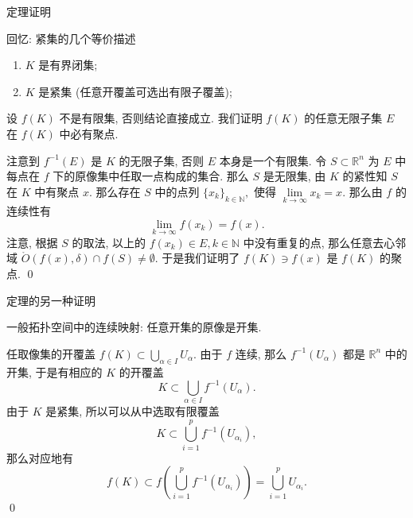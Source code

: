
\begin{frame}{定理证明}

回忆: 紧集的几个等价描述
\begin{enumerate}
\item $K$ 是有界闭集;
\item $K$ 是紧集 (任意开覆盖可选出有限子覆盖);
\end{enumerate}

\pause
\vspace{0.5em}

设 $f(K)$ 不是有限集, 否则结论直接成立. 我们证明 $f(K)$ 的任意无限子集 $E$ 在 $f(K)$ 中必有聚点.

\pause
\vspace{0.5em}

注意到 $f^{-1}(E)$ 是 $K$ 的无限子集, 否则 $E$ 本身是一个有限集. 令 $S \subset \mathbb{R}^n$ 为 $E$ 中每点在 $f$ 下的原像集中任取一点构成的集合. 那么 $S$ 是无限集, 由 $K$ 的紧性知 $S$ 在 $K$ 中有聚点 $x.$ 那么存在 $S$ 中的点列 $\{x_k\}_{k \in \mathbb{N}},$ 使得 $\lim\limits_{k \to \infty} x_k = x.$ 那么由 $f$ 的连续性有
\[\lim\limits_{k \to \infty} f(x_k) = f(x).\]
注意, 根据 $S$ 的取法, 以上的 $f(x_k) \in E, k \in \mathbb{N}$ 中没有重复的点, 那么任意去心邻域 $\mathring{O}(f(x), \delta) \cap f(S) \neq \emptyset.$ 于是我们证明了 $f(K) \ni f(x)$ 是 $f(K)$ 的聚点.
\qed

\end{frame}


\begin{frame}{定理的另一种证明}

一般拓扑空间中的连续映射: 任意开集的原像是开集.

\pause
\vspace{1em}

任取像集的开覆盖 $f(K) \subset \bigcup\limits_{\alpha \in I} U_{\alpha}.$ 由于 $f$ 连续, 那么 $f^{-1}(U_{\alpha})$ 都是 $\mathbb{R}^n$ 中的开集, 于是有相应的 $K$ 的开覆盖
\[K \subset \bigcup\limits_{\alpha \in I} f^{-1}(U_{\alpha}).\]
\pause
由于 $K$ 是紧集, 所以可以从中选取有限覆盖
\[K \subset \bigcup\limits_{i=1}^p f^{-1}(U_{\alpha_i}),\]
那么对应地有
\[f(K) \subset f\left(\bigcup\limits_{i=1}^p f^{-1}(U_{\alpha_i}) \right) = \bigcup\limits_{i=1}^p U_{\alpha_i}.\]
\qed

\end{frame}

